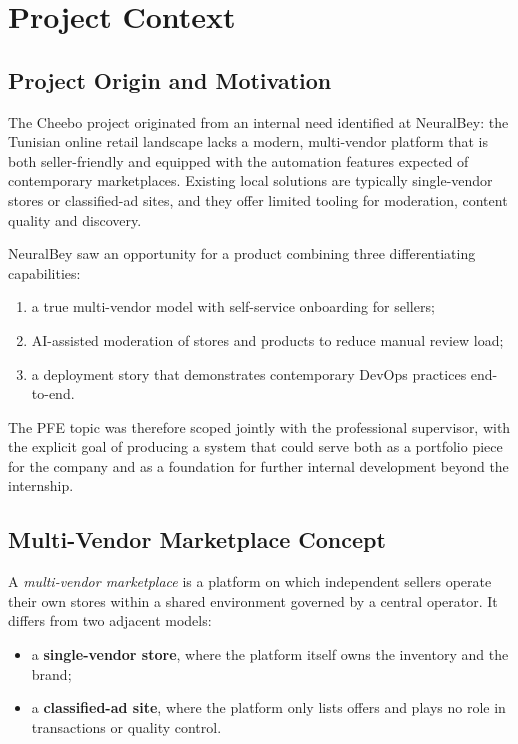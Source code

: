 \documentclass[12pt, a4paper, oneside]{report}
\begin{document}
\section{Project Context}

\subsection{Project Origin and Motivation}

The Cheebo project originated from an internal need identified at
NeuralBey: the Tunisian online retail landscape lacks a modern,
multi-vendor platform that is both seller-friendly and equipped with
the automation features expected of contemporary marketplaces.
Existing local solutions are typically single-vendor stores or
classified-ad sites, and they offer limited tooling for moderation,
content quality and discovery.

NeuralBey saw an opportunity for a product combining three
differentiating capabilities:

\begin{enumerate}[label=(\roman*),leftmargin=*,itemsep=2pt]
  \item a true multi-vendor model with self-service onboarding for
        sellers;
  \item AI-assisted moderation of stores and products to reduce
        manual review load;
  \item a deployment story that demonstrates contemporary DevOps
        practices end-to-end.
\end{enumerate}

The PFE topic was therefore scoped jointly with the professional
supervisor, with the explicit goal of producing a system that could
serve both as a portfolio piece for the company and as a foundation
for further internal development beyond the internship.

\subsection{Multi-Vendor Marketplace Concept}

A \emph{multi-vendor marketplace} is a platform on which independent
sellers operate their own stores within a shared environment governed
by a central operator. It differs from two adjacent models:

\begin{itemize}[leftmargin=*,itemsep=2pt]
  \item a \textbf{single-vendor store}, where the platform itself owns
        the inventory and the brand;
  \item a \textbf{classified-ad site}, where the platform only lists
        offers and plays no role in transactions or quality control.
\end{itemize}
\end{document}
